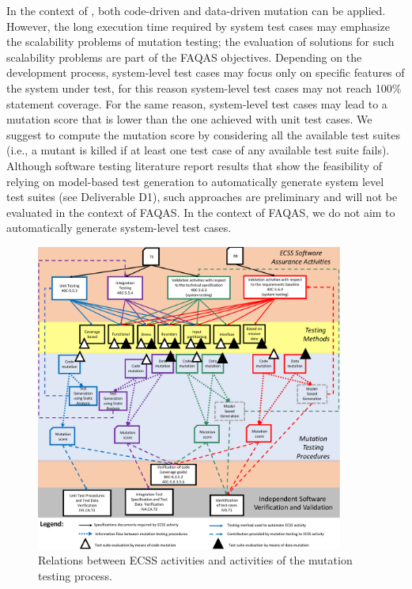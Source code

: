 In the context of , both code-driven and data-driven mutation can be applied. However, the long execution time required by system test cases may emphasize the scalability problems of mutation testing; the evaluation of solutions for such scalability problems are part of the FAQAS objectives.
Depending on the development process, system-level test cases may focus only on specific features of the system under test, for this reason system-level test cases may not reach 100\% statement coverage. For the same reason, system-level test cases may lead to a mutation score that is lower than the one achieved with unit test cases. We suggest to compute the mutation score by considering all the available test suites (i.e., a mutant is killed if at least one test case of any available test suite fails). Although software testing literature report results that show the feasibility of relying on model-based test generation to automatically generate system level test suites (see Deliverable D1), such approaches are preliminary and will not be evaluated in the context of FAQAS. In the context of FAQAS, we do not aim to automatically generate system-level test cases.

\begin{figure}[h]
  \centering
    \includegraphics[width=0.9\textwidth]{images/ECSSTesting}
      \caption{Relations between ECSS activities and activities of the mutation testing process.}
      \label{fig:ECSSTesting}
\end{figure} 

